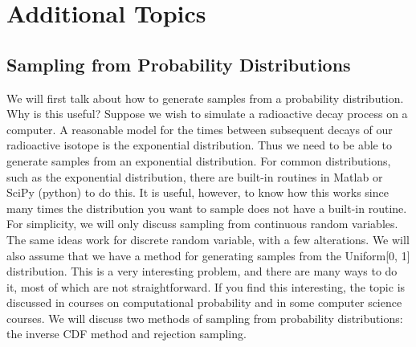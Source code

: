 \documentclass[12pt]{article}
\theoremstyle{definition}
\theoremstyle{remark}
\begin{document}
\setcounter{section}{7}
\section{Additional Topics}

\subsection{Sampling from Probability Distributions}
We will first talk about how to generate samples from a probability distribution. Why is this useful? Suppose we wish to simulate a radioactive decay process on a computer. A reasonable model for the times between subsequent decays of our radioactive isotope is the exponential distribution. Thus we need to be able to generate samples from an exponential distribution. For common distributions, such as the exponential distribution, there are built-in routines in Matlab or SciPy (python) to do this. It is useful, however, to know how this works since many times the distribution you want to sample does not have a built-in routine.\\

For simplicity, we will only discuss sampling from continuous random variables. The same ideas work for discrete random variable, with a few alterations. We will also assume that we have a method for generating samples from the Uniform[0, 1] distribution. This is a very interesting problem, and there are many ways to do it, most of which are not straightforward. If you find this interesting, the topic is discussed in courses on computational probability and in some computer science courses. We will discuss two methods of sampling from probability distributions: the inverse CDF method and rejection sampling.\\
\end{document}
